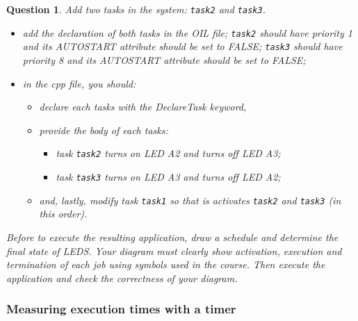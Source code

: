 \documentclass[11pt]{report}
\newcommand{\namedtodo}[2][]{%
{%
\todo[color={yellow!50},size=\small]{%
\textbf{TODO [\uppercase{#1}]:}~#2}%
}}
\newtheorem{ex}{Question}
\begin{document}
\begin{ex}
    Add two tasks in the system: \texttt{task2} and \texttt{task3}.
    \begin{itemize}
        \item add the declaration of both tasks in the OIL file; \texttt{task2} should have priority 1 and its AUTOSTART attribute should be set to FALSE; \texttt{task3} should have priority 8 and its AUTOSTART attribute should be set to FALSE;
        \item in the cpp file, you should:
            \begin{itemize}
                \item declare each tasks with the DeclareTask keyword,
                \item provide the body of each tasks:
                    \begin{itemize}
                        \item task \texttt{task2} turns on LED A2 and turns off LED A3;
                        \item task \texttt{task3} turns on LED A3 and turns off LED A2;
                    \end{itemize}
                \item and, lastly, modify task \texttt{task1} so that is activates \texttt{task2} and \texttt{task3} (in this order).
            \end{itemize}
    \end{itemize}

    Before to execute the resulting application, draw a schedule and determine the final state of LEDS.
    Your diagram must clearly show activation, execution and termination of each job using symbols used in the course.
    Then execute the application and check the correctness of your diagram.
\end{ex}

%


\subsubsection{Measuring execution times with a timer}
\end{document}
